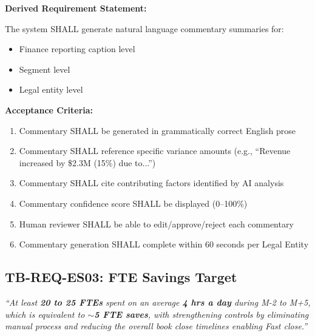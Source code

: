 \documentclass[11pt,a4paper,twoside]{report}
\begin{document}
\vspace{0.5em}
\textbf{Derived Requirement Statement:}

The system SHALL generate natural language commentary summaries for:
\begin{itemize}
\item Finance reporting caption level
\item Segment level
\item Legal entity level
\end{itemize}

\textbf{Acceptance Criteria:}

\begin{tcolorbox}[colback=sapamber!5,colframe=sapamber!70,title=Measurable Acceptance Criteria]
\begin{enumerate}[label=AC-ES02-\arabic*:,leftmargin=*]
\item Commentary SHALL be generated in grammatically correct English prose
\item Commentary SHALL reference specific variance amounts (e.g., ``Revenue increased
by \$2.3M (15\%) due to...'')
\item Commentary SHALL cite contributing factors identified by AI analysis
\item Commentary confidence score SHALL be displayed (0--100\%)
\item Human reviewer SHALL be able to edit/approve/reject each commentary
\item Commentary generation SHALL complete within 60 seconds per Legal Entity
\end{enumerate}
\end{tcolorbox}

\subsection{TB-REQ-ES03: FTE Savings Target}
\label{req:tb-req-es03}

\begin{tcolorbox}[colback=sourcegreen!5,colframe=sourcegreen!70,title=Source Quotation]
\textit{``At least \textbf{20 to 25 FTEs} spent on an average \textbf{4 hrs a day}
during M-2 to M+5, which is equivalent to \textbf{$\sim$5 FTE saves}, with
strengthening controls by eliminating manual process and reducing the overall
book close timelines enabling Fast close.''}
\end{tcolorbox}
\end{document}

